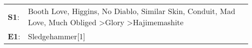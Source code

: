 \begin{supertabular}{p{0.03\textwidth}p{0.92\textwidth}}
 \textbf{S1}:  &  Booth Love\textsuperscript{}, \enspace Higgins\textsuperscript{}, \enspace No Diablo\textsuperscript{}, \enspace Similar Skin\textsuperscript{}, \enspace Conduit\textsuperscript{}, \enspace Mad Love\textsuperscript{}, \enspace Much Obliged\textsuperscript{} \textgreater \enspace Glory\textsuperscript{} \textgreater \enspace Hajimemashite\textsuperscript{}  \enspace  \\
 \textbf{E1}:  &                                                                                                                                                                                                                                                                                                                                      Sledgehammer[1]\textsuperscript{}  \enspace  \\
\end{supertabular}
